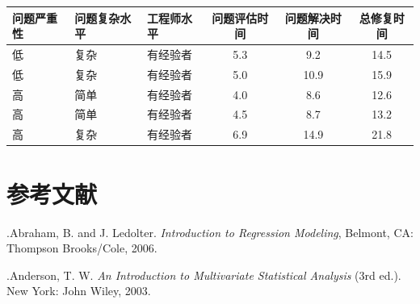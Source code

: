 \begin{mvtable}
\begin{tabular}{lllccc}
\toprule
问题严重性&问题复杂水平&工程师水平&问题评估时间&问题解决时间&总修复时间\\
\midrule
低&复杂&有经验者&5.3&9.2&14.5\\
低&复杂&有经验者&5.0&10.9&15.9\\
高&简单&有经验者&4.0&8.6&12.6\\
高&简单&有经验者&4.5&8.7&13.2\\
高&复杂&有经验者&6.9&14.9&21.8\\
\bottomrule
\end{tabular}
\end{mvtable}

\label{bib:7}
\section*{参考文献}

.\quad Abraham, B. and J. Ledolter. \textit{Introduction to Regression Modeling}, Belmont, CA: Thompson Brooks/Cole, 2006.

.\quad Anderson, T. W. \textit{An Introduction to Multivariate Statistical Analysis} (3rd ed.). New York: John Wiley, 2003.
